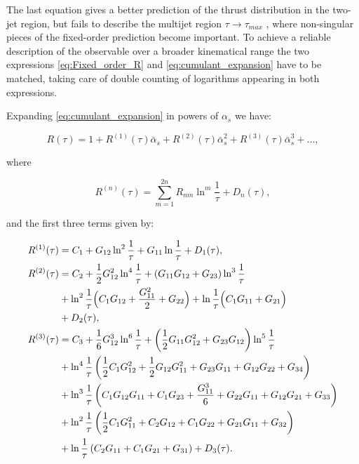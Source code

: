 \documentclass[../Tesi_Jiahao_Miao_986136.tex]{subfiles}
\begin{document}
The last equation gives a better prediction of the thrust distribution in the two-jet
region, but fails to describe the multijet region $\tau \to \tau_{max}$ , where non-singular pieces of the
fixed-order prediction become important. To achieve a reliable description of the observable
over a broader kinematical range the two expressions \cref{eq:Fixed_order_R} and \cref{eq:cumulant_expansion} have to be matched,
taking care of double counting of logarithms appearing in both expressions.

Expanding \cref{eq:cumulant_expansion} in powers of $\alpha_s$ we have:

\begin{equation}
    R(\tau) = 1 + R^{(1)}(\tau) \bar{\alpha}_s + R^{(2)}(\tau)\bar{\alpha}_s^2 + R^{(3)}(\tau)\bar{\alpha}_s^3+ \dots,
\end{equation}

where 

\begin{equation}
    R^{(n)}(\tau) = \sum_{m=1}^{2n} R_{nm} \ln^m \frac{1}{\tau} + D_n(\tau),
\end{equation}

and the first three terms given by:

\begin{equation}
    \begin{split}
        R^{(1)}(\tau) &= C_1  + G_{12} \ln ^2\frac{1}{\tau}+G_{11} \ln \frac{1}{\tau} + D_1(\tau),\\
        R^{(2)}(\tau) & = C_2 +\frac{1}{2} G_{12}^2 \ln ^4\frac{1}{\tau} +\left(G_{11} G_{12}+G_{23}\right) \ln ^3\frac{1}{\tau}\\
        &+\ln ^2\frac{1}{\tau} \Bigl(C_1 G_{12}+\frac{G_{11}^2}{2}+G_{22}\Bigr)+\ln \frac{1}{\tau} \Bigl(C_1 G_{11}+G_{21}\Bigr)\\
        &+ D_2(\tau),\\
        R^{(3)}(\tau) &= C_3 +\frac{1}{6} G_{12}^3 \ln ^6\frac{1}{\tau}+\left(\frac{1}{2} G_{11} G_{12}^2+G_{23} G_{12}\right) \ln ^5\frac{1}{\tau} \\
        &+ \ln ^4\frac{1}{\tau} \left(\frac{1}{2} C_1 G_{12}^2+\frac{1}{2} G_{12} G_{11}^2+G_{23} G_{11}+G_{12} G_{22}+G_{34}\right)\\
        &+\ln ^3\frac{1}{\tau} \left(C_1 G_{12} G_{11}+C_1 G_{23}+\frac{G_{11}^3}{6}+G_{22} G_{11}+G_{12} G_{21}+G_{33}\right)\\
        &+\ln ^2\frac{1}{\tau} \left(\frac{1}{2} C_1 G_{11}^2+C_2 G_{12}+C_1 G_{22}+G_{21} G_{11}+G_{32}\right)\\
        &+\ln \frac{1}{\tau} \left(C_2 G_{11}+C_1 G_{21}+G_{31}\right) + D_3(\tau).
    \end{split}
\end{equation}
\end{document}
